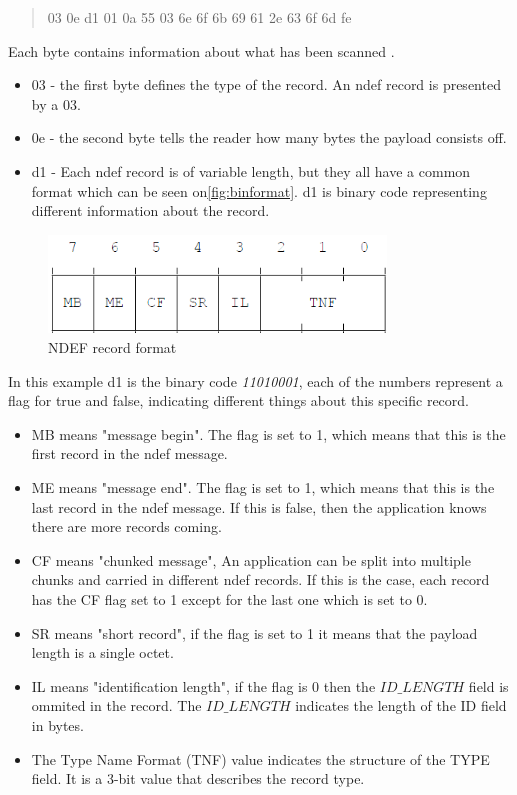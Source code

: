 \begin{quote}
03 0e d1 01 0a 55 03 6e 6f 6b 69 61 2e 63 6f 6d fe
\end{quote}

Each byte contains information about what has been scanned \citep{ndef}.

\begin{itemize}
\item 03 - the first byte defines the type of the record. An \ac{ndef} record is presented by a 03.
\item 0e - the second byte tells the reader how many bytes the payload consists off.
\item d1 - Each \ac{ndef} record is of variable length, but they all have a common format which can be seen on\autoref{fig:binformat}. d1 is binary code representing different information about the record.
\end{itemize}

\begin{figure}[H]
\centering
\includegraphics[width=0.8\textwidth]{img/binformat.png}
\caption{NDEF record format\citep{ndef}}
\label{fig:binformat}
\end{figure}

In this example d1 is the binary code \textit{11010001}, each of the numbers represent a flag for true and false, indicating different things about this specific record\citep{ndef}. 

\begin{itemize}
\item MB means "message begin". The flag is set to 1, which means that this is the first record in the \ac{ndef} message.
\item ME means "message end". The flag is set to 1, which means that this is the last record in the \ac{ndef} message. If this is false, then the application knows there are more records coming.
\item CF means "chunked message", An application can be split into multiple chunks and carried in different \ac{ndef} records. If this is the case, each record has the CF flag set to 1 except for the last one which is set to 0.
\item SR means "short record", if the flag is set to 1 it means that the payload length is a single octet. 
\item IL means "identification length", if the flag is 0 then the $ID\_LENGTH$ field is ommited in the record. The $ID\_LENGTH$ indicates the length of the ID field in bytes\citep{ndefformat}.
\item The Type Name Format (TNF) value indicates the structure of the TYPE field. It is a 3-bit value that describes the record type\citep{ndefformat}.
\end{itemize}

